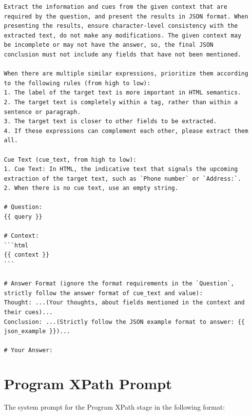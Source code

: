 \documentclass[a4paper]{article}
\begin{document}
\begin{tcolorbox}
  \begin{lstlisting}[language={}, basicstyle=\ttfamily, columns=fullflexible, breaklines=true]
Extract the information and cues from the given context that are required by the question, and present the results in JSON format. When presenting the results, ensure character-level consistency with the extracted text, do not make any modifications. The given context may be incomplete or may not have the answer, so, the final JSON conclusion must not include any fields that have not been mentioned.

When there are multiple similar expressions, prioritize them according to the following rules (from high to low):
1. The label of the target text is more important in HTML semantics.
2. The target text is completely within a tag, rather than within a sentence or paragraph.
3. The target text is closer to other fields to be extracted.
4. If these expressions can complement each other, please extract them all.

Cue Text (cue_text, from high to low):
1. Cue Text: In HTML, the indicative text that signals the upcoming extraction of the target text, such as `Phone number` or `Address:`.
2. When there is no cue text, use an empty string.

# Question:
{{ query }}

# Context:
```html
{{ context }}
```

# Answer Format (ignore the format requirements in the `Question`, strictly follow the answer format of cue_text and value):
Thought: ...(Your thoughts, about fields mentioned in the context and their cues)...
Conclusion: ...(Strictly follow the JSON example format to answer: {{ json_example }})...

# Your Answer:
\end{lstlisting}
\end{tcolorbox}

\section{Program XPath Prompt}
\label{sec:program_xpath_prompt}

The system prompt for the Program XPath stage in the following format:
\end{document}
